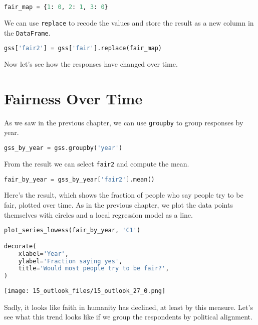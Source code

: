 \begin{lstlisting}[language=Python,style=source]
fair_map = {1: 0, 2: 1, 3: 0}
\end{lstlisting}

We can use \passthrough{\lstinline!replace!} to recode the values and
store the result as a new column in the
\passthrough{\lstinline!DataFrame!}.

\begin{lstlisting}[language=Python,style=source]
gss['fair2'] = gss['fair'].replace(fair_map)
\end{lstlisting}

Now let's see how the responses have changed over time.

\section{Fairness Over Time}\label{fairness-over-time}

As we saw in the previous chapter, we can use
\passthrough{\lstinline!groupby!} to group responses by year.

\begin{lstlisting}[language=Python,style=source]
gss_by_year = gss.groupby('year')
\end{lstlisting}

From the result we can select \passthrough{\lstinline!fair2!} and
compute the mean.

\begin{lstlisting}[language=Python,style=source]
fair_by_year = gss_by_year['fair2'].mean()
\end{lstlisting}

Here's the result, which shows the fraction of people who say people try
to be fair, plotted over time. As in the previous chapter, we plot the
data points themselves with circles and a local regression model as a
line.

\begin{lstlisting}[language=Python,style=source]
plot_series_lowess(fair_by_year, 'C1')

decorate(
    xlabel='Year',
    ylabel='Fraction saying yes',
    title='Would most people try to be fair?',
)
\end{lstlisting}

\begin{center}
\texttt{[image: 15\_outlook\_files/15\_outlook\_27\_0.png]}
\end{center}

Sadly, it looks like faith in humanity has declined, at least by this
measure. Let's see what this trend looks like if we group the
respondents by political alignment.

